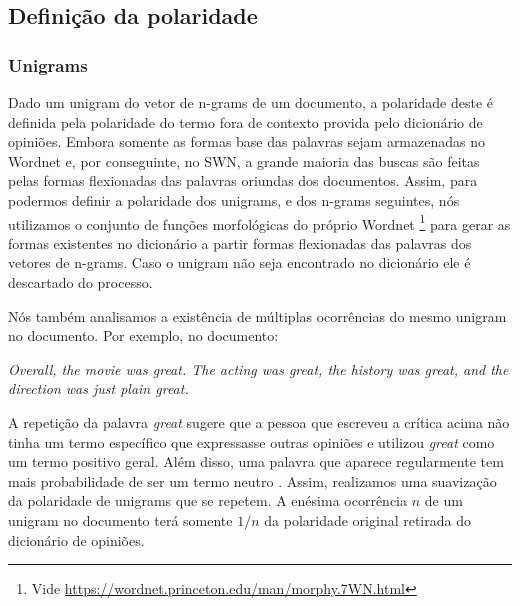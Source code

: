 \documentclass[template.tex]{subfiles}
\begin{document}
\subsection{Definição da polaridade}

\subsubsection{Unigrams}


Dado um unigram do vetor de n-grams de um documento, a polaridade deste é definida pela polaridade do termo fora de contexto provida pelo dicionário de opiniões. Embora somente as formas base das palavras sejam armazenadas no Wordnet e, por conseguinte, no SWN, a grande maioria das buscas são feitas pelas formas flexionadas das palavras oriundas dos documentos. Assim, para podermos definir a polaridade dos unigrams, e dos n-grams seguintes, nós utilizamos o conjunto de funções morfológicas do próprio Wordnet \footnote{Vide \url{https://wordnet.princeton.edu/man/morphy.7WN.html}} para gerar as formas existentes no dicionário a partir formas flexionadas das palavras dos vetores de n-grams. Caso o unigram não seja encontrado no dicionário ele é descartado do processo.


Nós também analisamos a existência de múltiplas ocorrências do mesmo unigram no documento. Por exemplo, no documento:

\textit{Overall, the movie was great. The acting was great, the history was great, and the direction was just plain great.}

A repetição da palavra \textit{great} sugere que a pessoa que escreveu a crítica acima não tinha um termo específico que expressasse outras opiniões e utilizou \textit{great} como um termo positivo geral. Além disso, uma palavra que aparece regularmente tem mais probabilidade de ser um termo neutro \cite{taboada2011lexicon}. Assim, realizamos uma suavização da polaridade de unigrams que se repetem. A enésima ocorrência $n$ de um unigram no documento terá somente $1/n$ da polaridade original retirada do dicionário de opiniões.
\end{document}
